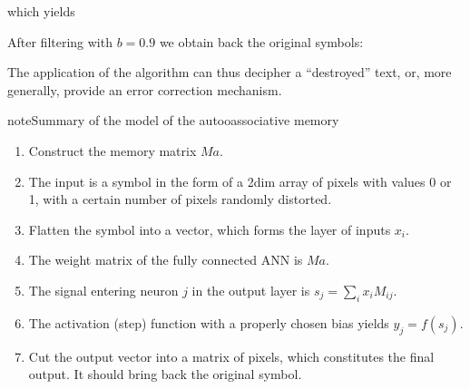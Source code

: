 \documentclass[letterpaper,10pt,english]{jupyterBook}
\begin{document}
\sphinxAtStartPar
which yields

\noindent{}

\sphinxAtStartPar
After filtering with \(b=0.9\) we obtain back the original symbols:

\begin{sphinxVerbatim}[commandchars=\\\{\}]
 

        
        
    \PYG{p}{[}\PYG{p}{]} 
\end{sphinxVerbatim}

\noindent{}

\sphinxAtStartPar
The application of the algorithm can thus decipher a “destroyed” text, or, more generally, provide an error correction mechanism.

\begin{sphinxadmonition}{note}{Summary of the model of the autooassociative memory}
\begin{enumerate}
%
\item {} 
\sphinxAtStartPar
Construct the memory matrix \(Ma\).

\item {} 
\sphinxAtStartPar
The input is a symbol in the form of a 2\sphinxhyphen{}dim array of pixels with values 0 or 1, with a
certain number of pixels randomly distorted.

\item {} 
\sphinxAtStartPar
Flatten the symbol into a vector, which forms the layer of inputs \(x_i\).

\item {} 
\sphinxAtStartPar
The weight matrix of the fully connected ANN is \(Ma\).

\item {} 
\sphinxAtStartPar
The signal entering neuron \(j\) in the output layer is \(s_j=\sum_i x_i M_{ij}\).

\item {} 
\sphinxAtStartPar
The activation (step) function with a properly chosen bias yields \(y_j=f(s_j)\).

\item {} 
\sphinxAtStartPar
Cut the output vector into a matrix of pixels, which constitutes the final output. It should bring back the original symbol.

\end{enumerate}
\end{sphinxadmonition}
\end{document}
